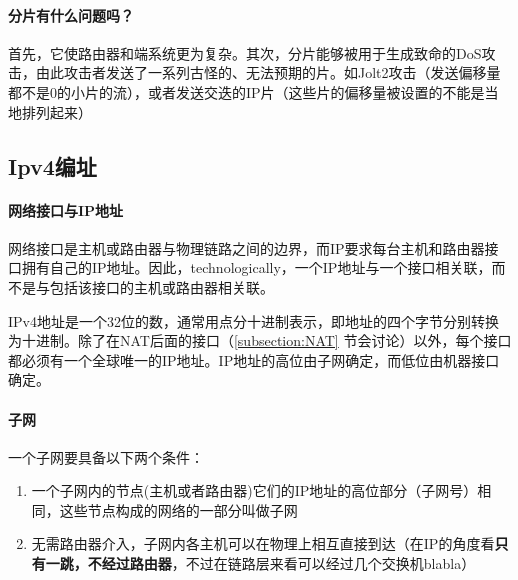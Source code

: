 \documentclass[]{report}
\begin{document}
			\paragraph{分片有什么问题吗？}
			首先，它使路由器和端系统更为复杂。其次，分片能够被用于生成致命的DoS攻击，由此攻击者发送了一系列古怪的、无法预期的片。如Jolt2攻击（发送偏移量都不是0的小片的流），或者发送交迭的IP片（这些片的偏移量被设置的不能是当地排列起来）
		\subsection{Ipv4编址}
			\paragraph{网络接口与IP地址}
			网络接口是主机或路由器与物理链路之间的边界，而IP要求每台主机和路由器接口拥有自己的IP地址。因此，technologically，一个IP地址与一个接口相关联，而不是与包括该接口的主机或路由器相关联。\par
			IPv4地址是一个32位的数，通常用点分十进制表示，即地址的四个字节分别转换为十进制。除了在NAT后面的接口（\ref{subsection:NAT} 节会讨论）以外，每个接口都必须有一个全球唯一的IP地址。IP地址的高位由子网确定，而低位由机器接口确定。\par
			\paragraph{子网}
			一个子网要具备以下两个条件：
			\begin{enumerate}
				\item 一个子网内的节点(主机或者路由器)它们的IP地址的高位部分（子网号）相同，这些节点构成的网络的一部分叫做子网
				\item 无需路由器介入，子网内各主机可以在物理上相互直接到达（在IP的角度看\textbf{只有一跳，不经过路由器}，不过在链路层来看可以经过几个交换机blabla）
			\end{enumerate}
\end{document}
